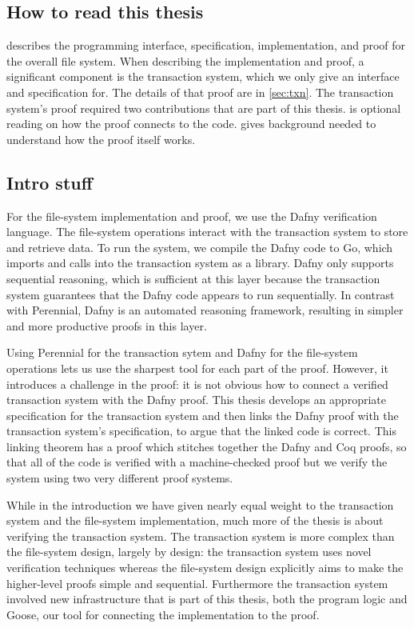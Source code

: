 \subsection{How to read this thesis}

 describes the programming interface, specification,
implementation, and proof for the overall file system. When describing the
implementation and proof, a significant component is the transaction system,
which we only give an interface and specification for. The details of that proof
are in \cref{sec:txn}. The transaction system's proof required two
contributions that are part of this thesis.  is optional
reading on how the proof connects to the code.  gives
background needed to understand how the proof itself works.

\subsection{Intro stuff}

For the file-system implementation and proof, we use the Dafny
verification language. The file-system operations interact with the
transaction system to store and retrieve data. To run the system, we
compile the Dafny code to Go, which imports and calls into the
transaction system as a library. Dafny only supports sequential
reasoning, which is sufficient at this layer because the transaction
system guarantees that the Dafny code appears to run sequentially. In contrast
with Perennial, Dafny is an automated reasoning framework, resulting in simpler
and more productive proofs in this layer.

Using Perennial for the transaction sytem and Dafny for the file-system
operations lets us use the sharpest tool for each part of the proof. However, it
introduces a challenge in the proof: it is not obvious how to connect a verified
transaction system with the Dafny proof. This thesis develops an appropriate
specification for the transaction system and then links the Dafny proof with the
transaction system's specification, to
argue that the linked code is correct. This linking theorem has a proof which stitches together
the Dafny and Coq proofs, so that all of the code is verified with a
machine-checked proof but we verify the system using two very different proof
systems.

While in the introduction we have given nearly equal weight to the transaction
system and the file-system implementation, much more of the thesis is about
verifying the transaction system. The transaction system is more complex than
the file-system design, largely by design: the transaction system uses novel
verification techniques whereas the file-system
design explicitly aims to make the higher-level proofs simple and sequential.
Furthermore the transaction system involved new infrastructure that is part of
this thesis, both the program logic and Goose, our tool for connecting the
implementation to the proof.

